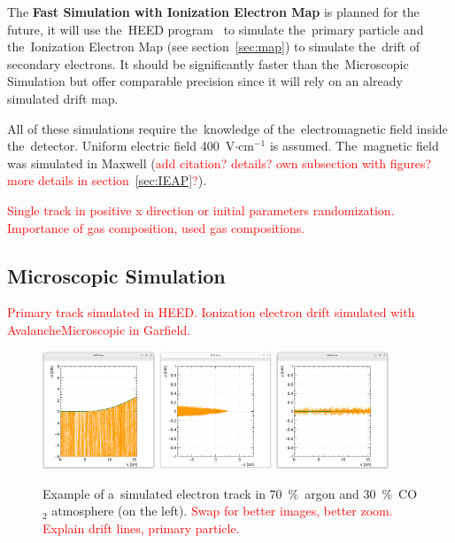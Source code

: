 \documentclass[]{article}
\begin{document}
	The \textbf{Fast Simulation with Ionization Electron Map} is planned for the future, it will use the~HEED program~\cite{HEED} to simulate the~primary particle and the~Ionization Electron Map (see section~\ref{sec:map}) to simulate the~drift of secondary electrons. It should be significantly faster than the~Microscopic Simulation but offer comparable precision since it will rely on an already simulated drift map.
	
	All of these simulations require the~knowledge of the~electromagnetic field inside the~detector. Uniform electric field 400~V$\cdot$cm$^{-1}$ is assumed. The~magnetic field was simulated in Maxwell (\textcolor{red}{add citation? details? own subsection with figures? more details in section~\ref{sec:IEAP}?}).
	
	\textcolor{red}{Single track in positive x direction or initial parameters randomization. Importance of gas composition, used gas compositions.}
	
	\subsection{Microscopic Simulation}
	\textcolor{red}{Primary track simulated in HEED. Ionization electron drift simulated with AvalancheMicroscopic in Garfield.}
	
	\begin{figure}
		\centering
		\includegraphics[width=0.3\textwidth]{7030_xz.png}
		\includegraphics[width=0.3\textwidth]{7030_yz.png}
		\includegraphics[width=0.3\textwidth]{7030_xy.png}
		\caption{Example of a~simulated electron track in 70~\%~argon and 30~\%~CO$_2$ atmosphere (on the left). \textcolor{red}{Swap for better images, better zoom. Explain drift lines, primary particle.}}
		\label{fig:7030sim}
	\end{figure}
	
\end{document}
